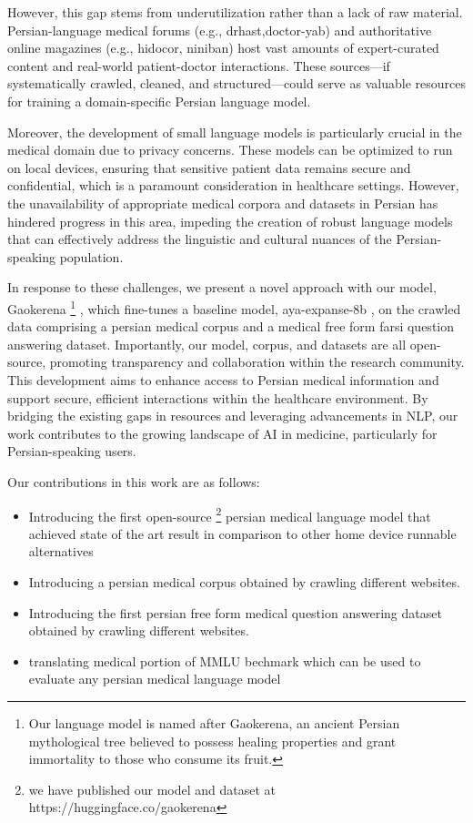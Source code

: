 \documentclass[conference]{IEEEtran}
\begin{document}
However, this gap stems from underutilization rather than a lack of raw material. Persian-language medical forums (e.g., drhast,doctor-yab) and authoritative online magazines (e.g., hidocor, niniban) host vast amounts of expert-curated content and real-world patient-doctor interactions. These sources—if systematically crawled, cleaned, and structured—could serve as valuable resources for training a domain-specific Persian language model.

Moreover, the development of small language models is particularly crucial in the medical domain due to privacy concerns. These models can be optimized to run on local devices, ensuring that sensitive patient data remains secure and confidential, which is a paramount consideration in healthcare settings. However, the unavailability of appropriate medical corpora and datasets in Persian has hindered progress in this area, impeding the creation of robust language models that can effectively address the linguistic and cultural nuances of the Persian-speaking population.

In response to these challenges, we present a novel approach with our model, Gaokerena
\footnote{
Our language model is named after Gaokerena, an ancient Persian mythological tree believed to possess healing properties and grant immortality to those who consume its fruit.
}
, which fine-tunes a baseline model, aya-expanse-8b
\cite{b5}
, on the crawled data comprising a persian medical corpus and a medical free form farsi question answering dataset. Importantly, our model, corpus, and datasets are all open-source, promoting transparency and collaboration within the research community. This development aims to enhance access to Persian medical information and support secure, efficient interactions within the healthcare environment. By bridging the existing gaps in resources and leveraging advancements in NLP, our work contributes to the growing landscape of AI in medicine, particularly for Persian-speaking users.

Our contributions in this work are as follows:
\begin{itemize}
	\item Introducing the first open-source
	\footnote{
	we have published our model and dataset at https://huggingface.co/gaokerena
	}
	persian medical language model that achieved state of the art result in
	comparison to other home device runnable alternatives
	\item Introducing a persian medical corpus obtained by crawling different websites.
	\item  Introducing the first persian free form medical question answering dataset obtained by crawling different websites.
	\item translating medical portion of MMLU bechmark which can be used to evaluate any persian medical language model
\end{itemize}
\end{document}

